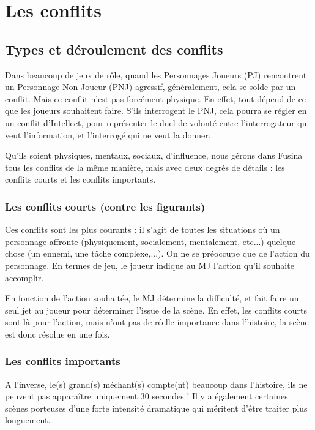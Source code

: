 \chapter{Les conflits}

\begin{multicols}{2}

\section{Types et déroulement des conflits}

Dans beaucoup de jeux de rôle, quand les Personnages Joueurs (PJ) rencontrent un Personnage Non Joueur (PNJ) agressif, généralement, cela se solde par un conflit. Mais ce conflit n'est pas forcément physique. En effet, tout dépend de ce que les joueurs souhaitent faire. S'ils interrogent le PNJ, cela pourra se régler en un conflit d'Intellect, pour représenter le duel de volonté entre l'interrogateur qui veut l'information, et l'interrogé qui ne veut la donner.

Qu'ils soient physiques, mentaux, sociaux, d'influence, nous gérons dans Fusina tous les conflits de la même manière, mais avec deux degrés de détails : les conflits courts et les conflits importants.

\subsection{Les conflits courts (contre les figurants)}

    Ces conflits sont les plus courants : il s'agit de toutes les situations où un personnage affronte (physiquement, socialement, mentalement, etc...) quelque chose (un ennemi, une tâche complexe,...). On ne se préoccupe que de l'action du personnage. En termes de jeu, le joueur indique au MJ l'action qu'il souhaite accomplir.

    En fonction de l'action souhaitée, le MJ détermine la difficulté, et fait faire un seul jet au joueur pour déterminer l'issue de la scène. En effet, les conflits courts sont là pour l'action, mais n'ont pas de réelle importance dans l'histoire, la scène est donc résolue en une fois.
    
\subsection{Les conflits importants}

    A l'inverse, le(s) grand(s) méchant(s) compte(nt) beaucoup dans l'histoire, ils ne peuvent pas apparaître uniquement 30 secondes ! Il y a également certaines scènes porteuses d'une forte intensité dramatique qui méritent d'être traiter plus longuement.


\end{multicols}
